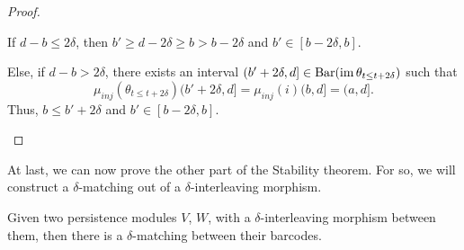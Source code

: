 \begin{proof}
\begin{enumerate}
    If $ d-b \leq 2 \delta $, then $ b' \geq d - 2\delta \geq b > b -2 \delta $ and $ b' \in [b - 2 \delta, b] $.

    Else, if $ d-b > 2 \delta $, there exists an interval $ (b' + 2\delta, d] \in \operatorname{Bar}(\operatorname{im} \theta_{t \leq t+2\delta}) $ such that 
    $$
        \mu_{inj}(\theta_{t \leq t+2\delta})(b' + 2\delta, d] = \mu_{inj}(i)(b, d] = (a,d].
    $$
    Thus, $ b \leq b' + 2\delta $ and $ b' \in [b - 2 \delta, b] $.
\end{enumerate}
\end{proof}

At last, we can now prove the other part of the Stability theorem. For so, we will construct a $\delta$-matching out of a $\delta$-interleaving morphism.

\begin{proposition} \cite[Theorem 3.0.2]{polterovich} \label{prop:matching-if-interleaving}
    Given two persistence modules $ V $, $ W $, with a $\delta$-interleaving morphism between them, then there is a $ \delta$-matching between their barcodes.
\end{proposition}
